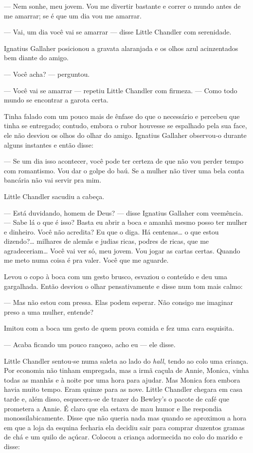 --- Nem sonhe, meu jovem.  Vou me divertir bastante e correr o mundo antes de
me amarrar; se é que um dia vou me amarrar.

--- Vai, um dia você vai se amarrar --- disse Little Chandler com serenidade.

Ignatius Gallaher posicionou a gravata alaranjada e os olhos azul acinzentados
bem diante do amigo.

--- Você acha? --- perguntou.

--- Você vai se amarrar --- repetiu Little Chandler com firmeza.  --- Como todo
mundo se encontrar a garota certa.

Tinha falado com um pouco mais de ênfase do que o necessário e percebeu que
tinha se entregado; contudo, embora o rubor houvesse se espalhado pela sua
face, ele não desviou os olhos do olhar do amigo.  Ignatius Gallaher observou-o
durante alguns instantes e então disse:

--- Se um dia isso acontecer, você pode ter certeza de que não vou perder tempo
com romantismo.  Vou dar o golpe do baú.  Se a mulher não tiver uma bela conta
bancária não vai servir pra mim.

Little Chandler sacudiu a cabeça.

--- Está duvidando, homem de Deus? --- disse Ignatius Gallaher com veemência.
--- Sabe lá o que é isso?  Basta eu abrir a boca e amanhã mesmo posso ter
mulher e dinheiro.  Você não acredita?  Eu que o diga.  Há centenas\ldots{} o
que estou dizendo?\ldots{} milhares de alemãs e judias ricas, podres de ricas,
que me agradeceriam\ldots{} Você vai ver só, meu jovem.  Vou jogar as cartas
certas.  Quando me meto numa coisa é pra valer.  Você que me aguarde.

Levou o copo à boca com um gesto brusco, esvaziou o conteúdo e deu uma
gargalhada.  Então desviou o olhar pensativamente e disse num tom mais calmo:

--- Mas não estou com pressa.  Elas podem esperar.  Não consigo me imaginar
preso a uma mulher, entende?

Imitou com a boca um gesto de quem prova comida e fez uma cara esquisita.

--- Acaba ficando um pouco rançoso, acho eu --- ele disse.

\smallskip

\noindent\dotfill

\smallskip

Little Chandler sentou-se numa saleta ao lado do \textit{hall}, tendo ao colo
uma criança.  Por economia não tinham empregada, mas a irmã caçula de Annie,
Monica, vinha todas as manhãs e à noite por uma hora para ajudar.  Mas Monica
fora embora havia muito tempo.  Eram quinze para as nove.  Little Chandler
chegara em casa tarde e, além disso, esquecera-se de trazer do Bewley’s o
pacote de café que prometera a Annie.  É claro que ela estava de mau humor e
lhe respondia monossilabicamente.  Disse que não queria nada mas quando se
aproximou a hora em que a loja da esquina fecharia ela decidiu sair para
comprar duzentos gramas de chá e um quilo de açúcar.  Colocou a criança
adormecida no colo do marido e disse:

